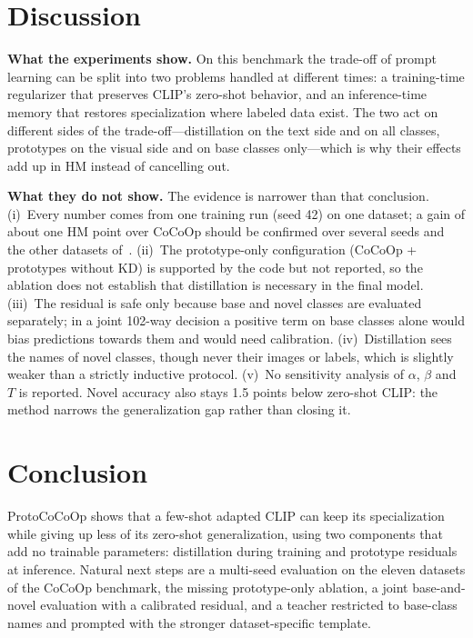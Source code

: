 \documentclass[10pt,twocolumn,a4paper]{article}
\newcommand{\para}[1]{\textbf{#1}\hspace{0.4em}}
\begin{document}
\section{Discussion}

\para{What the experiments show.} On this benchmark the trade-off of prompt learning can
be split into two problems handled at different times: a training-time regularizer that
preserves CLIP's zero-shot behavior, and an inference-time memory that restores
specialization where labeled data exist. The two act on different sides of the
trade-off---distillation on the text side and on all classes, prototypes on the visual
side and on base classes only---which is why their effects add up in HM instead of
cancelling out.

\para{What they do not show.} The evidence is narrower than that conclusion. (i)~Every
number comes from one training run (seed 42) on one dataset; a gain of about one HM point
over CoCoOp should be confirmed over several seeds and the other datasets
of~\cite{cocoop}. (ii)~The prototype-only configuration (CoCoOp + prototypes without KD) is
supported by the code but not reported, so the ablation does not establish that
distillation is necessary in the final model. (iii)~The residual is safe only because base
and novel classes are evaluated separately; in a joint 102-way decision a positive term on
base classes alone would bias predictions towards them and would need calibration.
(iv)~Distillation sees the names of novel classes, though never their images or labels,
which is slightly weaker than a strictly inductive protocol. (v)~No sensitivity analysis
of $\alpha$, $\beta$ and $T$ is reported. Novel accuracy also stays 1.5 points below
zero-shot CLIP: the method narrows the generalization gap rather than closing it.

\section{Conclusion}

ProtoCoCoOp shows that a few-shot adapted CLIP can keep its specialization while giving up
less of its zero-shot generalization, using two components that add no trainable
parameters: distillation during training and prototype residuals at inference. Natural
next steps are a multi-seed evaluation on the eleven datasets of the CoCoOp benchmark, the
missing prototype-only ablation, a joint base-and-novel evaluation with a calibrated
residual, and a teacher restricted to base-class names and prompted with the stronger
dataset-specific template.
\end{document}
